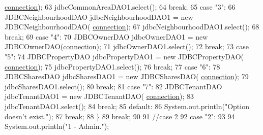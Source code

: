 \begin{DoxyCode}
      \mbox{\hyperlink{classcms_1_1_c_m_s_afc28cfd2c4356509b85775219b7b1e05}{connection}});
63                         jdbcCommonAreaDAO1.select();
64                     \textcolor{keywordflow}{break};
65                     \textcolor{keywordflow}{case} \textcolor{stringliteral}{"3"}:
66                         JDBCNeighbourhoodDAO jdbcNeighbourhoodDAO1 = \textcolor{keyword}{new} JDBCNeighbourhoodDAO(
      \mbox{\hyperlink{classcms_1_1_c_m_s_afc28cfd2c4356509b85775219b7b1e05}{connection}});
67                         jdbcNeighbourhoodDAO1.select();
68                     \textcolor{keywordflow}{break};
69                     \textcolor{keywordflow}{case} \textcolor{stringliteral}{"4"}:
70                         JDBCOwnerDAO jdbcOwnerDAO1 = \textcolor{keyword}{new} JDBCOwnerDAO(\mbox{\hyperlink{classcms_1_1_c_m_s_afc28cfd2c4356509b85775219b7b1e05}{connection}});
71                         jdbcOwnerDAO1.select();
72                     \textcolor{keywordflow}{break};
73                     \textcolor{keywordflow}{case} \textcolor{stringliteral}{"5"}:
74                         JDBCPropertyDAO jdbcPropertyDAO1 = \textcolor{keyword}{new} JDBCPropertyDAO(
      \mbox{\hyperlink{classcms_1_1_c_m_s_afc28cfd2c4356509b85775219b7b1e05}{connection}});
75                         jdbcPropertyDAO1.select();
76                     \textcolor{keywordflow}{break};
77                     \textcolor{keywordflow}{case} \textcolor{stringliteral}{"6"}:
78                         JDBCSharesDAO jdbcSharesDAO1 = \textcolor{keyword}{new} JDBCSharesDAO(
      \mbox{\hyperlink{classcms_1_1_c_m_s_afc28cfd2c4356509b85775219b7b1e05}{connection}});
79                         jdbcSharesDAO1.select();
80                     \textcolor{keywordflow}{break};
81                     \textcolor{keywordflow}{case} \textcolor{stringliteral}{"7"}:
82                         JDBCTenantDAO jdbcTenantDAO1 = \textcolor{keyword}{new} JDBCTenantDAO(
      \mbox{\hyperlink{classcms_1_1_c_m_s_afc28cfd2c4356509b85775219b7b1e05}{connection}});
83                         jdbcTenantDAO1.select();
84                     \textcolor{keywordflow}{break};
85                     \textcolor{keywordflow}{default}:
86                         System.out.println(\textcolor{stringliteral}{"Option doesn't exist."});
87                     \textcolor{keywordflow}{break};
88                 \}
89                 \textcolor{keywordflow}{break};
90                 
91      \textcolor{comment}{//case 2}
92             \textcolor{keywordflow}{case} \textcolor{stringliteral}{"2"}:
93                 
94                 System.out.println(\textcolor{stringliteral}{"1 - Admin."});

\end{DoxyCode}
